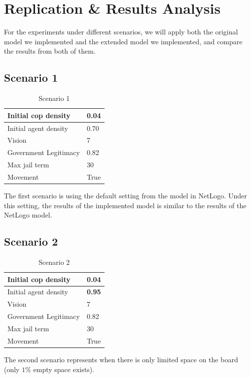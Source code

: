 \documentclass[11pt]{article}
\begin{document}
    \section{Replication \& Results Analysis}
    For the experiments under different scenarios, we will apply both the original
    model we implemented and the extended model we implemented, and compare the
    results from both of them.
    \subsection{Scenario 1}
     \begin{table}[ht]
        \begin{center}
          \begin{tabular}{|l|l|}
          \hline
            Initial cop density & 0.04 \\
          \hline
            Initial agent density & 0.70 \\
          \hline
            Vision & 7 \\
          \hline
            Government Legitimacy & 0.82 \\
          \hline
            Max jail term & 30 \\
          \hline
            Movement & True \\
          \hline
          \end{tabular}
          \caption{Scenario 1}\label{table1}
        \end{center}
      \end{table}
      The first scenario is using the default setting from the model in 
      NetLogo. Under this setting, the results of the implemented model is
      similar to the results of the NetLogo model. 

      \subsection{Scenario 2}
      \begin{table}[ht]
        \begin{center}
          \begin{tabular}{|l|l|}
          \hline
            Initial cop density & 0.04 \\
          \hline
            Initial agent density & \textbf{0.95} \\
          \hline
            Vision & 7 \\
          \hline
            Government Legitimacy & 0.82 \\
          \hline
            Max jail term & 30 \\
          \hline
            Movement & True \\
          \hline
          \end{tabular}
          \caption{Scenario 2}\label{table2}
        \end{center}
      \end{table}
      The second scenario represents when there is only limited space on the board
      (only $1\%$ empty space exists).
\end{document}
